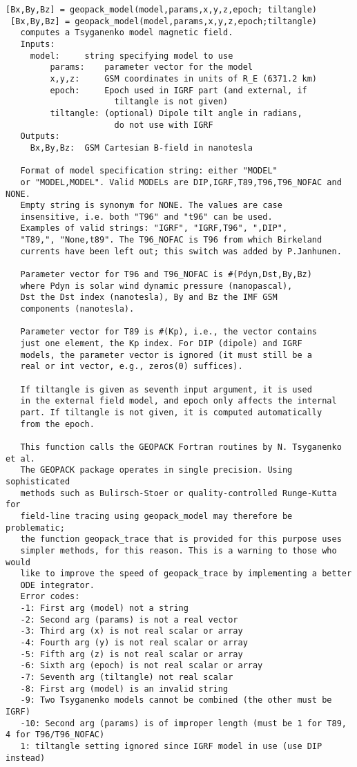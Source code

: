 \documentclass[a4paper]{article}
\begin{document}
\begin{tscreen}
\begin{verbatim}
[Bx,By,Bz] = geopack_model(model,params,x,y,z,epoch; tiltangle)
 [Bx,By,Bz] = geopack_model(model,params,x,y,z,epoch;tiltangle)
   computes a Tsyganenko model magnetic field.
   Inputs:
     model:     string specifying model to use
         params:    parameter vector for the model
         x,y,z:     GSM coordinates in units of R_E (6371.2 km)
         epoch:     Epoch used in IGRF part (and external, if
                      tiltangle is not given)
         tiltangle: (optional) Dipole tilt angle in radians,
                      do not use with IGRF
   Outputs:
     Bx,By,Bz:  GSM Cartesian B-field in nanotesla

   Format of model specification string: either "MODEL"
   or "MODEL,MODEL". Valid MODELs are DIP,IGRF,T89,T96,T96_NOFAC and NONE.
   Empty string is synonym for NONE. The values are case
   insensitive, i.e. both "T96" and "t96" can be used.
   Examples of valid strings: "IGRF", "IGRF,T96", ",DIP",
   "T89,", "None,t89". The T96_NOFAC is T96 from which Birkeland
   currents have been left out; this switch was added by P.Janhunen.

   Parameter vector for T96 and T96_NOFAC is #(Pdyn,Dst,By,Bz)
   where Pdyn is solar wind dynamic pressure (nanopascal),
   Dst the Dst index (nanotesla), By and Bz the IMF GSM
   components (nanotesla).

   Parameter vector for T89 is #(Kp), i.e., the vector contains
   just one element, the Kp index. For DIP (dipole) and IGRF
   models, the parameter vector is ignored (it must still be a
   real or int vector, e.g., zeros(0) suffices).
   
   If tiltangle is given as seventh input argument, it is used
   in the external field model, and epoch only affects the internal
   part. If tiltangle is not given, it is computed automatically
   from the epoch.

   This function calls the GEOPACK Fortran routines by N. Tsyganenko et al.
   The GEOPACK package operates in single precision. Using sophisticated
   methods such as Bulirsch-Stoer or quality-controlled Runge-Kutta for
   field-line tracing using geopack_model may therefore be problematic;
   the function geopack_trace that is provided for this purpose uses
   simpler methods, for this reason. This is a warning to those who would
   like to improve the speed of geopack_trace by implementing a better
   ODE integrator.
   Error codes:
   -1: First arg (model) not a string
   -2: Second arg (params) is not a real vector
   -3: Third arg (x) is not real scalar or array
   -4: Fourth arg (y) is not real scalar or array
   -5: Fifth arg (z) is not real scalar or array
   -6: Sixth arg (epoch) is not real scalar or array
   -7: Seventh arg (tiltangle) not real scalar
   -8: First arg (model) is an invalid string
   -9: Two Tsyganenko models cannot be combined (the other must be IGRF)
   -10: Second arg (params) is of improper length (must be 1 for T89, 4 for T96/T96_NOFAC)
   1: tiltangle setting ignored since IGRF model in use (use DIP instead)
\end{verbatim}
\end{tscreen}
\end{document}
